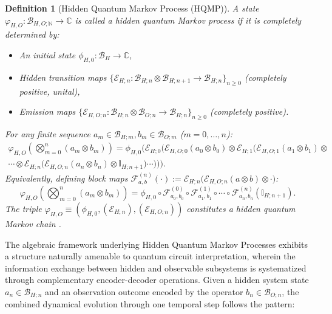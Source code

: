 \documentclass[12pt, reco]{article}
\newtheorem{definition}[theorem]{Definition}
\begin{document}
\begin{definition}[Hidden Quantum Markov Process (HQMP)]\label{def-QHMP}
A state \(\varphi_{H,O} : \mathcal{B}_{H,O;\mathbb{N}} \to \mathbb{C}\) is called a  hidden quantum Markov process  if it is completely determined by:
\begin{itemize}
    \item An  initial state  \(\phi_{H,0} : \mathcal{B}_H \to \mathbb{C}\),
    \item  Hidden transition maps  \(\{\mathcal{E}_{H;n} : \mathcal{B}_{H;n} \otimes \mathcal{B}_{H;n+1} \to \mathcal{B}_{H;n}\}_{n \ge 0}\) (completely positive, unital),
    \item  Emission maps  \(\{\mathcal{E}_{H,O;n} : \mathcal{B}_{H;n} \otimes \mathcal{B}_{O;n} \to \mathcal{B}_{H;n}\}_{n \ge 0}\) (completely positive).
\end{itemize}
For any finite sequence \(a_m \in \mathcal{B}_{H;m}, b_m \in \mathcal{B}_{O;m}\) (\(m = 0,\dots,n\)):
\begin{equation}\label{eq:joint-expectation-recursive}
\begin{aligned}
\varphi_{H,O}\left(\bigotimes_{m=0}^{n} (a_m \otimes b_m)\right) = \phi_{H,0} \Bigg( \mathcal{E}_{H;0}\bigg( \mathcal{E}_{H,O;0}(a_0 \otimes b_0) \otimes \mathcal{E}_{H;1}\Big( \mathcal{E}_{H,O;1}(a_1 \otimes b_1) \otimes \\
\cdots \otimes \mathcal{E}_{H;n}\big( \mathcal{E}_{H,O;n}(a_n \otimes b_n) \otimes \mathbb{I}_{H;n+1} \big) \cdots \Big) \bigg) \Bigg).
\end{aligned}
\end{equation}
Equivalently, defining  block maps  \(\mathcal{F}_{a,b}^{(n)}(\cdot) := \mathcal{E}_{H;n}\big(\mathcal{E}_{H,O;n}(a \otimes b) \otimes \cdot\big)\):
\[
\varphi_{H,O}\left(\bigotimes_{m=0}^{n} (a_m \otimes b_m)\right)
= \phi_{H,0} \circ \mathcal{F}_{a_0,b_0}^{(0)} \circ \mathcal{F}_{a_1,b_1}^{(1)} \circ \cdots \circ \mathcal{F}_{a_n,b_n}^{(n)}(\mathbb{I}_{H;n+1}).
\]
The triple \(\varphi_{H,O} \equiv (\phi_{H,0}, (\mathcal{E}_{H;n}), (\mathcal{E}_{H,O;n}))\) constitutes a  hidden quantum Markov chain .
\end{definition}




The algebraic framework underlying Hidden Quantum Markov Processes exhibits a structure naturally amenable to quantum circuit interpretation, wherein the information exchange between hidden and observable subsystems is systematized through complementary encoder-decoder operations.   Given a hidden system state $a_n \in \mathcal{B}_{H;n}$ and an observation outcome encoded by the operator $b_n \in \mathcal{B}_{O;n}$, the combined dynamical evolution through one temporal step follows the pattern:
\end{document}
